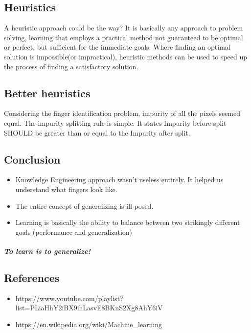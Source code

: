 \documentclass[a4paper]{article}
\begin{document}
\subsection{Heuristics}

A heuristic approach could be the way? It is basically any approach to problem solving, learning that employs a practical method not guaranteed to be optimal or perfect, but sufficient for the immediate goals. Where finding an optimal solution is impossible(or impractical), heuristic methods can be used to speed up the process of finding a satisfactory solution. 

\subsection{Better heuristics}

Considering the finger identification problem, impurity of all the pixels seemed equal. 
The impurity splitting rule is simple. It states Impurity before split SHOULD be greater than or equal to the Impurity after split.

\subsection{Conclusion }

\begin{itemize}
\item Knowledge Engineering approach wasn't useless entirely. It helped us understand what fingers look like.
\item  The entire concept of generalizing is ill-posed. 
\item  Learning is basically the ability to balance between two strikingly different goals (performance and generalization) 
\end{itemize}

\subparagraph{To learn is to generalize! }

\subsection{References}

\begin{itemize}
\item https://www.youtube.com/playlist?list=PLiaHhY2iBX9ihLasvE8BKnS2Xg8AhY6iV
\item https://en.wikipedia.org/wiki/Machine\_learning 
\end{itemize}
\end{document}
